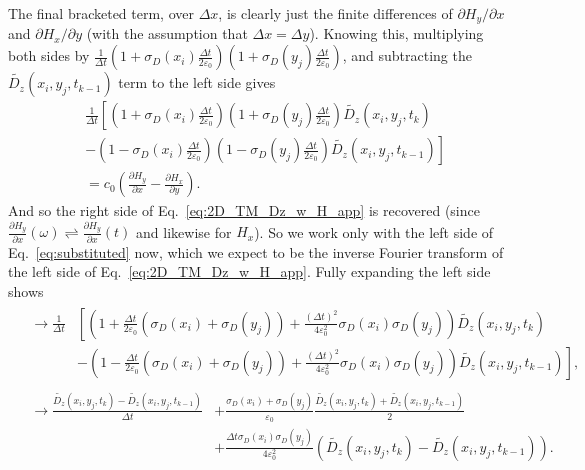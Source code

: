 \documentclass[12pt,twocolumn]{article}
\begin{document}
The final bracketed term, over $\Delta x$, is clearly just the finite differences of $\partial H_y/\partial x$ and $\partial H_x/\partial y$ (with the assumption that $\Delta x = \Delta y$). Knowing this, multiplying both sides by $\frac{1}{\Delta t}\left(1+\sigma_D(x_i)\frac{\Delta t}{2\varepsilon_0}\right)\left(1+\sigma_D(y_j)\frac{\Delta t}{2\varepsilon_0}\right)$, and subtracting the $\tilde{D_z}(x_i,y_j,t_{k-1})$ term to the left side gives
\begin{equation}
\label{eq:substituted}
\begin{split}
&\frac{1}{\Delta t}\left[\left(1+\sigma_D(x_i)\frac{\Delta t}{2\varepsilon_0}\right)\left(1+\sigma_D(y_j)\frac{\Delta t}{2\varepsilon_0}\right)\tilde{D_z}(x_i,y_j,t_k)\right. \\
&\left.- \left(1-\sigma_D(x_i)\frac{\Delta t}{2\varepsilon_0}\right)\left(1-\sigma_D(y_j)\frac{\Delta t}{2\varepsilon_0}\right)\tilde{D_z}(x_i,y_j,t_{k-1})\right]\\
& = c_0\left(\frac{\partial H_y}{\partial x}-\frac{\partial H_x}{\partial y}\right).
\end{split}
\end{equation}
And so the right side of Eq.~\ref{eq:2D_TM_Dz_w_H_app} is recovered (since $\frac{\partial H_y}{\partial x}(\omega) \rightleftharpoons \frac{\partial H_y}{\partial x}(t)$ and likewise for $H_x$). So we work only with the left side of Eq.~\ref{eq:substituted} now, which we expect to be the inverse Fourier transform of the left side of Eq.~\ref{eq:2D_TM_Dz_w_H_app}. Fully expanding the left side shows
\begin{align*}
&\begin{aligned}
\rightarrow\frac{1}{\Delta t}&\left[\left(1+\frac{\Delta t}{2\varepsilon_0}\left(\sigma_D(x_i)+\sigma_D(y_j)\right)+\frac{\left(\Delta t\right)^2}{4\varepsilon_0^2}\sigma_D(x_i)\sigma_D(y_j)\right)\tilde{D_z}(x_i,y_j,t_k)\right.\\
&\left.-\left(1-\frac{\Delta t}{2\varepsilon_0}\left(\sigma_D(x_i)+\sigma_D(y_j)\right)+\frac{\left(\Delta t\right)^2}{4\varepsilon_0^2}\sigma_D(x_i)\sigma_D(y_j)\right)\tilde{D_z}(x_i,y_j,t_{k-1})\right],
\end{aligned}\\
&\begin{aligned}
\rightarrow \frac{\tilde{D_z}(x_i,y_j,t_k)-\tilde{D_z}(x_i,y_j,t_{k-1})}{\Delta t} &+ \frac{\sigma_D(x_i)+\sigma_D(y_j)}{\varepsilon_0}\frac{\tilde{D_z}(x_i,y_j,t_k)+\tilde{D_z}(x_i,y_j,t_{k-1})}{2}\\
& + \frac{\Delta t \sigma_D(x_i)\sigma_D(y_j)}{4\varepsilon_0^2}\left(\tilde{D_z}(x_i,y_j,t_k)-\tilde{D_z}(x_i,y_j,t_{k-1})\right).
\end{aligned}
\end{align*}
\end{document}
